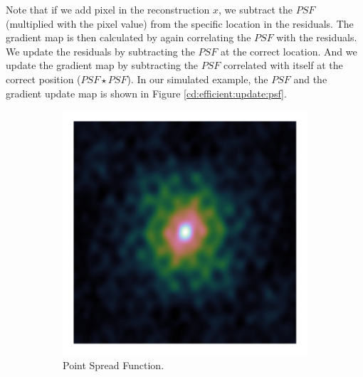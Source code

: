 Note that if we add pixel in the reconstruction $x$, we subtract the $PSF$ (multiplied with the pixel value) from the specific location in the residuals. The gradient map is then calculated by again correlating the $PSF$ with the residuals. We update the residuals by subtracting the $PSF$ at the correct location. And we update the gradient map by subtracting the $PSF$ correlated with itself at the correct position ($PSF \star PSF$). In our simulated example, the $PSF$ and the gradient update map is shown in Figure \ref{cd:efficient:update:psf}.
\begin{figure}[!h]
	\centering
	\begin{subfigure}[b]{0.3\linewidth}
		\includegraphics[width=\linewidth, clip, trim= 0.25in 0.25in 0.25in 0.25in]{./chapters/03.cd/simulated/psf.png}
		\caption{Point Spread Function.}
		\label{cd:efficient:update:dirty}
	\end{subfigure}
	\begin{subfigure}[b]{0.3\linewidth}

\end{subfigure}
\end{figure}
